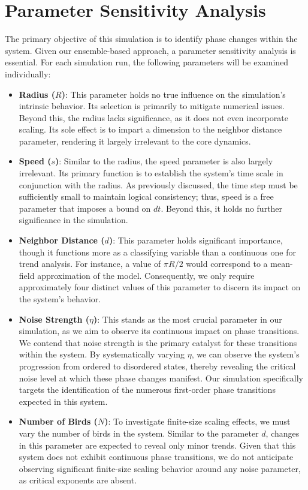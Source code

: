 \documentclass[12pt,a4paper]{article}
\begin{document}
\section{Parameter Sensitivity Analysis}
The primary objective of this simulation is to identify phase changes within the system. Given our ensemble-based approach, a parameter sensitivity analysis is essential. For each simulation run, the following parameters will be examined individually:
\begin{itemize}
    \item \textbf{Radius ($R$)}: 
    This parameter holds no true influence on the simulation's intrinsic behavior. Its selection is primarily to mitigate numerical issues. Beyond this, the radius lacks significance, as it does not even incorporate scaling. Its sole effect is to impart a dimension to the neighbor distance parameter, rendering it largely irrelevant to the core dynamics.
    \item \textbf{Speed ($s$)}: 
    Similar to the radius, the speed parameter is also largely irrelevant. Its primary function is to establish the system's time scale in conjunction with the radius. As previously discussed, the time step must be sufficiently small to maintain logical consistency; thus, speed is a free parameter that imposes a bound on \(dt\). Beyond this, it holds no further significance in the simulation.
    \item \textbf{Neighbor Distance ($d$)}: 
    This parameter holds significant importance, though it functions more as a classifying variable than a continuous one for trend analysis. For instance, a value of \(\pi R/2 \) would correspond to a mean-field approximation of the model. Consequently, we only require approximately four distinct values of this parameter to discern its impact on the system's behavior.
    \item \textbf{Noise Strength ($\eta$)}: 
    This stands as the most crucial parameter in our simulation, as we aim to observe its continuous impact on phase transitions. We contend that noise strength is the primary catalyst for these transitions within the system. By systematically varying \(\eta\), we can observe the system's progression from ordered to disordered states, thereby revealing the critical noise level at which these phase changes manifest. Our simulation specifically targets the identification of the numerous first-order phase transitions expected in this system.
    \item \textbf{Number of Birds ($N$)}: 
    To investigate finite-size scaling effects, we must vary the number of birds in the system. Similar to the parameter \(d\), changes in this parameter are expected to reveal only minor trends. Given that this system does not exhibit continuous phase transitions, we do not anticipate observing significant finite-size scaling behavior around any noise parameter, as critical exponents are absent.

\end{itemize}
\end{document}
